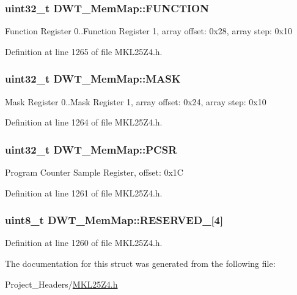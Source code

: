 \subsubsection[{\texorpdfstring{F\+U\+N\+C\+T\+I\+ON}{FUNCTION}}]{\setlength{\rightskip}{0pt plus 5cm}uint32\+\_\+t D\+W\+T\+\_\+\+Mem\+Map\+::\+F\+U\+N\+C\+T\+I\+ON}\hypertarget{struct_d_w_t___mem_map_ad60c09cefe311e7809d9a57fad402f5c}{}\label{struct_d_w_t___mem_map_ad60c09cefe311e7809d9a57fad402f5c}
Function Register 0..Function Register 1, array offset\+: 0x28, array step\+: 0x10 

Definition at line 1265 of file M\+K\+L25\+Z4.\+h.

\subsubsection[{\texorpdfstring{M\+A\+SK}{MASK}}]{\setlength{\rightskip}{0pt plus 5cm}uint32\+\_\+t D\+W\+T\+\_\+\+Mem\+Map\+::\+M\+A\+SK}\hypertarget{struct_d_w_t___mem_map_a34e5e25a9ec81fc61eca09c6d6adadfa}{}\label{struct_d_w_t___mem_map_a34e5e25a9ec81fc61eca09c6d6adadfa}
Mask Register 0..Mask Register 1, array offset\+: 0x24, array step\+: 0x10 

Definition at line 1264 of file M\+K\+L25\+Z4.\+h.

\subsubsection[{\texorpdfstring{P\+C\+SR}{PCSR}}]{\setlength{\rightskip}{0pt plus 5cm}uint32\+\_\+t D\+W\+T\+\_\+\+Mem\+Map\+::\+P\+C\+SR}\hypertarget{struct_d_w_t___mem_map_a58d461cd26674ff3bce87778c4b54164}{}\label{struct_d_w_t___mem_map_a58d461cd26674ff3bce87778c4b54164}
Program Counter Sample Register, offset\+: 0x1C 

Definition at line 1261 of file M\+K\+L25\+Z4.\+h.

\subsubsection[{\texorpdfstring{R\+E\+S\+E\+R\+V\+E\+D\+\_\+0}{RESERVED_0}}]{\setlength{\rightskip}{0pt plus 5cm}uint8\+\_\+t D\+W\+T\+\_\+\+Mem\+Map\+::\+R\+E\+S\+E\+R\+V\+E\+D\+\_\mbox{[}4\mbox{]}}\hypertarget{struct_d_w_t___mem_map_a3c654f29dbc5f37bda4115869613ce2d}{}\label{struct_d_w_t___mem_map_a3c654f29dbc5f37bda4115869613ce2d}


Definition at line 1260 of file M\+K\+L25\+Z4.\+h.



The documentation for this struct was generated from the following file\+:\begin{DoxyCompactItemize}
\item 
Project\+\_\+\+Headers/\hyperlink{_m_k_l25_z4_8h}{M\+K\+L25\+Z4.\+h}\end{DoxyCompactItemize}
